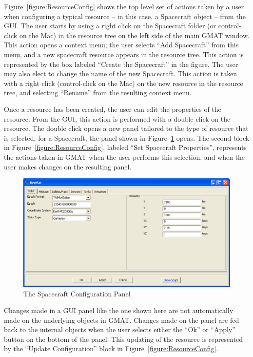 Figure~\ref{figure:ResourceConfig} shows the top level set of actions taken by a user when
configuring a typical resource -- in this case, a Spacecraft object -- from the GUI.  The user
starts by using a right click on the Spacecraft folder (or control-click on the Mac) in the
resource tree on the left side of the main GMAT window.  This action opens a context menu; the user
selects ``Add Spacecraft'' from this menu, and a new spacecraft resource appears in the resource
tree.  This action is represented by the box labeled ``Create the Spacecraft'' in the figure.  The
user may also elect to change the name of the new Spacecraft.  This action is taken with a right
click (control-click on the Mac) on the new resource in the resource tree, and selecting
``Rename'' from the resulting context menu.

Once a resource has been created, the user can edit the properties of the resource.  From the GUI,
this action is performed with a double click on the resource.  The double click opens a new panel
tailored to the type of resource that is selected; for a Spacecraft, the panel shown in
Figure~\ref{figure:SpacecraftConfigPanel} opens.  The second block in
Figure~\ref{figure:ResourceConfig}, labeled ``Set Spacecraft Properties'', represents the actions
taken in GMAT when the user performs this selection, and when the user makes changes on the
resulting panel.

\begin{figure}[htb]
\begin{center}
\includegraphics[scale=0.5]{Images/SpacecraftPanel.eps}
\caption{\label{figure:SpacecraftConfigPanel}The Spacecraft Configuration Panel}
\end{center}
\end{figure}

Changes made in a GUI panel like the one shown here are not automatically made on the underlying
objects in GMAT.  Changes made on the panel are fed back to the internal objects when the user
selects either the ``Ok'' or ``Apply'' button on the bottom of the panel.  This updating of the
resource is represented by the ``Update Configuration'' block in Figure~\ref{figure:ResourceConfig}.

